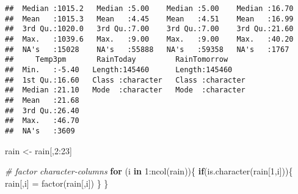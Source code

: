 \documentclass[
]{article}
\newenvironment{Shaded}{\begin{snugshade}}{\end{snugshade}}
\newcommand{\CommentTok}[1]{\textcolor[rgb]{0.56,0.35,0.01}{\textit{#1}}}
\newcommand{\ControlFlowTok}[1]{\textcolor[rgb]{0.13,0.29,0.53}{\textbf{#1}}}
\newcommand{\DecValTok}[1]{\textcolor[rgb]{0.00,0.00,0.81}{#1}}
\newcommand{\FunctionTok}[1]{\textcolor[rgb]{0.00,0.00,0.00}{#1}}
\newcommand{\NormalTok}[1]{#1}
\newcommand{\OtherTok}[1]{\textcolor[rgb]{0.56,0.35,0.01}{#1}}
\newcommand{\SpecialCharTok}[1]{\textcolor[rgb]{0.00,0.00,0.00}{#1}}
\begin{document}
\begin{verbatim}
##  Median :1015.2   Median :5.00    Median :5.00    Median :16.70  
##  Mean   :1015.3   Mean   :4.45    Mean   :4.51    Mean   :16.99  
##  3rd Qu.:1020.0   3rd Qu.:7.00    3rd Qu.:7.00    3rd Qu.:21.60  
##  Max.   :1039.6   Max.   :9.00    Max.   :9.00    Max.   :40.20  
##  NA's   :15028    NA's   :55888   NA's   :59358   NA's   :1767   
##     Temp3pm       RainToday         RainTomorrow      
##  Min.   :-5.40   Length:145460      Length:145460     
##  1st Qu.:16.60   Class :character   Class :character  
##  Median :21.10   Mode  :character   Mode  :character  
##  Mean   :21.68                                        
##  3rd Qu.:26.40                                        
##  Max.   :46.70                                        
##  NA's   :3609
\end{verbatim}

\begin{Shaded}
\begin{Highlighting}[]
\NormalTok{rain }\OtherTok{\textless{}{-}}\NormalTok{ rain[,}\DecValTok{2}\SpecialCharTok{:}\DecValTok{23}\NormalTok{]}

\CommentTok{\# factor character{-}columns}
\ControlFlowTok{for}\NormalTok{ (i }\ControlFlowTok{in} \DecValTok{1}\SpecialCharTok{:}\FunctionTok{ncol}\NormalTok{(rain))\{}
    \ControlFlowTok{if}\NormalTok{(}\FunctionTok{is.character}\NormalTok{(rain[}\DecValTok{1}\NormalTok{,i]))\{}
\NormalTok{        rain[,i] }\OtherTok{=} \FunctionTok{factor}\NormalTok{(rain[,i])}
\NormalTok{    \}}
\NormalTok{\}}
\end{Highlighting}
\end{Shaded}
\end{document}
